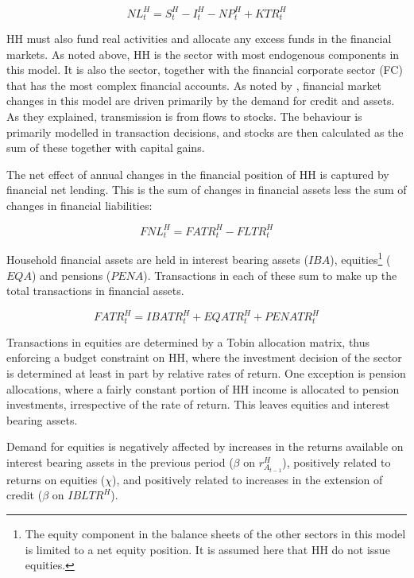 \documentclass[
]{book}
\begin{document}
\begin{equation}
NL^H_t = S^H_t - I^H_t - NP^H_t + KTR^H_t
\end{equation}

HH must also fund real activities and allocate any excess funds in the financial markets.
As noted above, HH is the sector with most endogenous components in this model. It is
also the sector, together with the financial corporate sector (FC) that has the most complex financial accounts.
As noted by \citet{byrialsenraza2019empirical}, financial market changes in this model are
driven primarily by the demand for credit and assets. As they explained, transmission
is from flows to stocks. The behaviour is primarily modelled in transaction decisions,
and stocks are then calculated as the sum of these together with capital gains.

The net effect of annual changes in the financial position of HH is captured by
financial net lending. This is the sum of changes in financial assets less the
sum of changes in financial liabilities:

\begin{equation}
FNL^H_t = FATR^H_t - FLTR^H_t
\end{equation}

Household financial assets are held in interest bearing assets (\(IBA\)), equities\footnote{The equity component in the balance sheets of the other sectors in this model
  is limited to a net equity position. It is assumed here that HH do not issue equities.} (\(EQA\)) and
pensions (\(PENA\)). Transactions in each of these sum to make up the total
transactions in financial assets.

\begin{equation}
FATR^H_t = IBATR^H_t + EQATR^H_t + PENATR^H_t
\end{equation}

Transactions in equities are determined by a Tobin allocation matrix, thus enforcing a
budget constraint on HH, where the investment decision of the sector is determined at
least in part by relative rates of return. One exception is pension allocations, where a
fairly constant portion of HH income is allocated to pension investments, irrespective of
the rate of return. This leaves equities and interest bearing assets.

Demand for equities is negatively affected by increases in the returns available on interest
bearing assets in the previous period (\(\beta\) on \(r^H_{A_{t-1}}\)), positively related to
returns on equities (\(\chi\)), and positively related to increases in the extension of
credit (\(\beta\) on \(IBLTR^H\)).
\end{document}
